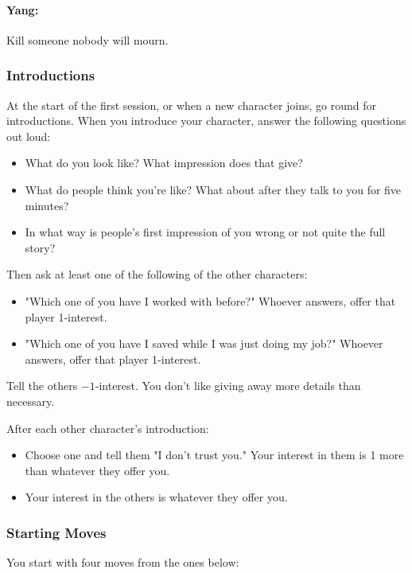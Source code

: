 \paragraph{Yang:} Kill someone nobody will mourn.

\subsubsection{Introductions}
At the start of the first session, or when a new character joins, go round for introductions.
When you introduce your character, answer the following questions out loud:
\begin{itemize}
\item What do you look like? What impression does that give?
\item What do people think you're like? What about after they talk to you for five minutes?
\item In what way is people's first impression of you wrong or not quite the full story?
\end{itemize}

Then ask at least one of the following of the other characters:
\begin{itemize}
\item "Which one of you have I worked with before?" Whoever answers, offer that player 1-interest.
\item "Which one of you have I saved while I was just doing my job?" Whoever answers, offer that player 1-interest.
\end{itemize}
Tell the others $-1$-interest. You don't like giving away more details than necessary.

After each other character's introduction:
\begin{itemize}
\item Choose one and tell them "I don't trust you." Your interest in them is 1 more than whatever they offer you.
\item Your interest in the others is whatever they offer you.
\end{itemize}

\subsubsection{Starting Moves}
You start with four moves from the ones below:


